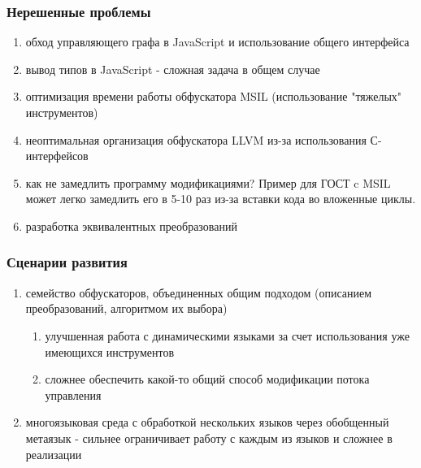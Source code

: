 \documentclass[10pt]{beamer}
\begin{document}
\begin{frame}
\frametitle{Нерешенные проблемы}
\begin{enumerate}
    \item обход управляющего графа в JavaScript и использование общего интерфейса
    \item вывод типов в JavaScript - сложная задача в общем случае
    \item оптимизация времени работы обфускатора MSIL (использование "тяжелых" инструментов)
    \item неоптимальная организация обфускатора LLVM из-за использования С-интерфейсов
    \item как не замедлить программу модификациями? Пример для ГОСТ c MSIL может легко замедлить его в 5-10 раз из-за вставки кода во вложенные циклы.
    \item разработка эквивалентных преобразований
\end{enumerate}
\end{frame}
    

\begin{frame}
\frametitle{Сценарии развития}
\begin{enumerate}
    \item семейство обфускаторов, объединенных общим подходом (описанием преобразований, алгоритмом их выбора)
    \begin{enumerate}
        \item улучшенная работа с динамическими языками за счет использования уже имеющихся инструментов
        \item сложнее обеспечить какой-то общий способ модификации потока управления 
    \end{enumerate}
    \item  многоязыковая среда с обработкой нескольких языков через обобщенный метаязык - сильнее ограничивает работу с каждым из языков и сложнее в реализации
    
\end{enumerate}
\end{frame}
\end{document}

